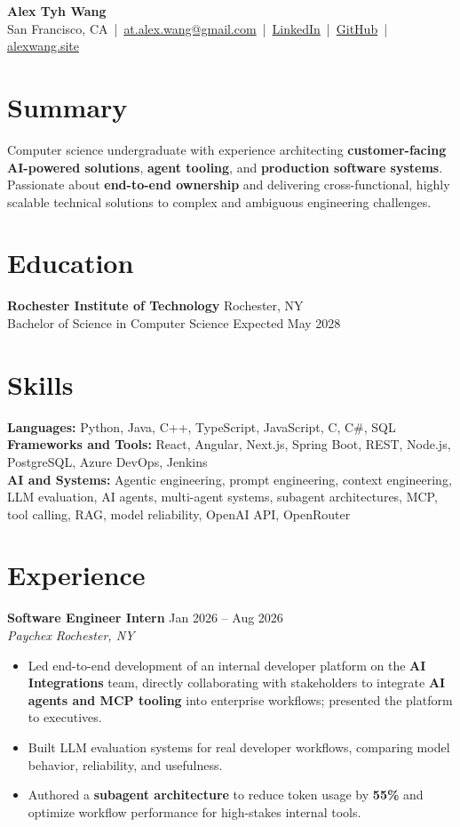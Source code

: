\documentclass[10pt,letterpaper]{article}
\newif\ifresumeFirstRole
\newcommand{\resumeRole}[4]{%
  \ifresumeFirstRole
    \global\resumeFirstRolefalse
  \else
    \vspace{0pt plus 1fill}%
  \fi
  \textbf{#1} \hfill #2\\
  \textit{#3} \hfill \textit{#4}
}
\begin{document}
\begin{center}
{\Large \textbf{Alex Tyh Wang}}\\
San Francisco, CA \,|\, \href{mailto:at.alex.wang@gmail.com}{at.alex.wang@gmail.com} \,|\, \href{https://www.linkedin.com/in/alex-tyh-wang/}{LinkedIn} \,|\, \href{https://github.com/alextyhwang}{GitHub} \,|\, \href{https://alexwang.site}{alexwang.site}
\end{center}

\section*{Summary}
Computer science undergraduate with experience architecting \textbf{customer-facing AI-powered solutions}, \textbf{agent tooling}, and \textbf{production software systems}. Passionate about \textbf{end-to-end ownership} and delivering cross-functional, highly scalable technical solutions to complex and ambiguous engineering challenges.

\section*{Education}
\textbf{Rochester Institute of Technology} \hfill Rochester, NY\\
Bachelor of Science in Computer Science \hfill Expected May 2028

\section*{Skills}
\textbf{Languages:} Python, Java, C++, TypeScript, JavaScript, C, C\#, SQL\\
\textbf{Frameworks and Tools:} React, Angular, Next.js, Spring Boot, REST, Node.js, PostgreSQL, Azure DevOps, Jenkins\\
\textbf{AI and Systems:} Agentic engineering, prompt engineering, context engineering, LLM evaluation, AI agents, multi-agent systems, subagent architectures, MCP, tool calling, RAG, model reliability, OpenAI API, OpenRouter

\section*{Experience}
\resumeRole{Software Engineer Intern}{Jan 2026 -- Aug 2026}{Paychex}{Rochester, NY}
\begin{itemize}
  \item Led end-to-end development of an internal developer platform on the \textbf{AI Integrations} team, directly collaborating with stakeholders to integrate \textbf{AI agents and MCP tooling} into enterprise workflows; presented the platform to executives.
  \item Built LLM evaluation systems for real developer workflows, comparing model behavior, reliability, and usefulness.
  \item Authored a \textbf{subagent architecture} to reduce token usage by \textbf{55\%} and optimize workflow performance for high-stakes internal tools.
\end{itemize}
\end{document}
